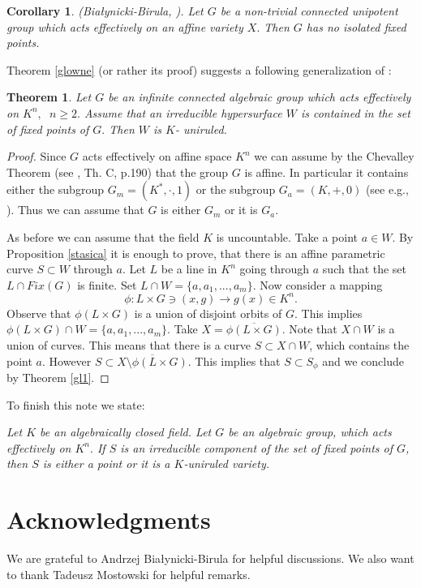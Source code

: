 \documentclass{amsproc}
\newtheorem{theo}[defi]{Theorem}
\newtheorem{co}[defi]{Corollary}
\begin{document}
\begin{co}(Bia\l ynicki-Birula, \cite{b-b}).
Let $G$ be a non-trivial connected unipotent  group which acts
effectively on an affine variety $X.$ Then $G$ has no isolated
fixed points.
\end{co}

Theorem \ref{glowne} (or rather its proof) suggests  a following
generalization of \cite{jel}:

\begin{theo}\label{glowne1}
Let $G$ be an infinite connected algebraic group which acts
effectively on $K^n,$ $\ n\ge 2.$ Assume that an irreducible
hypersurface $W$ is contained in the set of fixed points of $G.$
Then $W$ is $K$- uniruled.
\end{theo}

\begin{proof} Since $G$ acts effectively on affine space $K^n$ we can
assume by the Chevalley Theorem (see \cite{sha}, Th. C, p.190)
that the group $G$ is affine. In particular it contains either the
subgroup $G_m=(K^*,\cdot, 1)$ or the subgroup $G_a=(K,+,0)$ (see
e.g., \cite{iit}). Thus we can assume that $G$ is either $G_m$ or
it is $G_a.$

As before we can assume that the field $K$ is uncountable. Take a
point $a \in W.$ By Proposition \ref{stasica} it is enough to
prove, that there is an affine parametric curve $S\subset W$
through $a.$ Let $L$ be a line in $K^n$ going through $a$ such
that the set $L\cap Fix(G)$ is finite. Set $L\cap W=\{ a, a_1,...,
a_m\}.$ Now consider a mapping
$$\phi : L\times G\ni (x, g)\to g(x)\in K^n.$$ Observe that
$\phi(L\times G)$ is a union of disjoint orbits of $G.$ This
implies $\phi(L\times G)\cap W=\{ a, a_1,..., a_m\}.$ Take
$X=\overline{\phi(L\times G)}.$ Note that $X\cap W$ is a union of
curves. This means that there is a curve $S\subset X\cap W$, which
contains the point $a.$ However $S\subset \overline{X\setminus
\phi(L\times G)}.$ This implies that $S\subset S_\phi$ and we
conclude by Theorem \ref{gl1}.
\end{proof}

To finish this note we state:

\vspace{2mm}  {\it Let $K$ be an
algebraically closed field. Let $G$ be an algebraic group, which
acts effectively on $K^n.$ If $S$ is an irreducible component of
the set of fixed points of $G$, then $S$ is either a point or it
is a $K$-uniruled variety.}

\section*{Acknowledgments} 
We are grateful to Andrzej Bia\l ynicki-Birula  for helpful discussions. We also want to thank
Tadeusz Mostowski  for helpful remarks.
\end{document}
